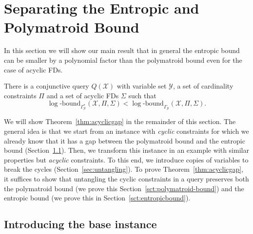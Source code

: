 \documentclass[a4paper,cleveref]{lipics-v2021}
\newcommand{\logb}{\mathrm{\log\text{-}bound}}
\newcommand{\vset}[1]{\mathcal{#1}}
\begin{document}
\section{Separating the Entropic and Polymatroid Bound}

In this section we will show our main result that in general the entropic bound can be smaller by a polynomial factor than the polymatroid bound even for the case of acyclic FDs.

\begin{theorem}\label{thm:acyclicgap}
	There is a conjunctive query $Q(\vset X)$ with variable set $\vset Y$, 
	a set of cardinality constraints $\Pi$ and a set of acyclic FDs $\Sigma$ such that 
	\[
	\logb_{\Gamma^*_{\vset Y}}(\vset X, \Pi, \Sigma) < \logb_{\Gamma_{\vset Y}}(\vset X, \Pi, \Sigma).
	\] 
\end{theorem}

We will show Theorem~\ref{thm:acyclicgap} in the remainder of this section.
The general idea is that we start from an instance with \emph{cyclic} constraints for which we already know that it has a gap between the polymatroid bound and the entropic bound (Section~\ref{sec:introduceZY}). 
Then, we transform this instance in an example with similar properties but \emph{acyclic} constraints. To this end, 
we introduce copies of variables to break the cycles (Section~\ref{sec:untangling}). 
To prove Theorem~\ref{thm:acyclicgap}, 
it suffices to show that untangling the cyclic constraints in a query preserves both the polymatroid bound (we prove this Section~\ref{sct:polymatroid-bound}) and the entropic bound (we prove this in Section~\ref{sct:entropicbound}).

\subsection{Introducing the base instance}\label{sec:introduceZY}
\end{document}
